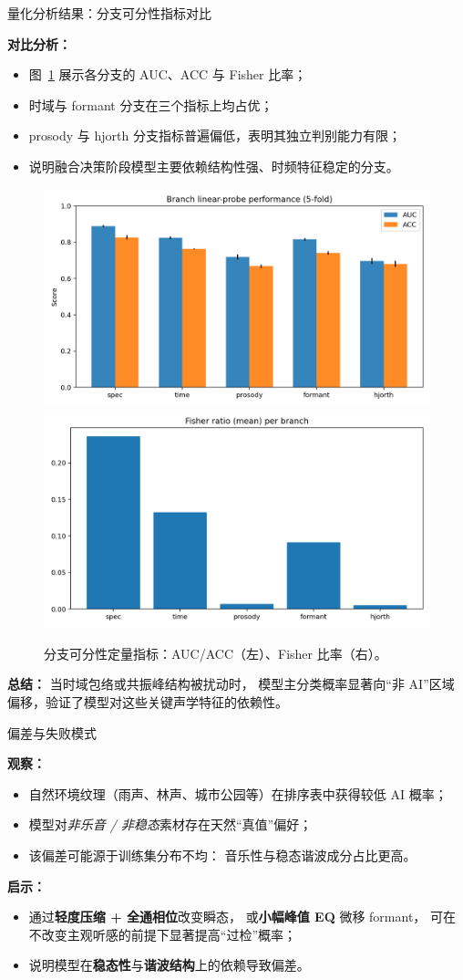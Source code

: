 \documentclass[aspectratio=169]{beamer}
\begin{document}
\begin{frame}{量化分析结果：分支可分性指标对比}

\textbf{对比分析：}
\begin{itemize}
  \item 图~\ref{fig:branch_metrics} 展示各分支的 AUC、ACC 与 Fisher 比率；
  \item 时域与 formant 分支在三个指标上均占优；
  \item prosody 与 hjorth 分支指标普遍偏低，表明其独立判别能力有限；
  \item 说明融合决策阶段模型主要依赖结构性强、时频特征稳定的分支。
\end{itemize}

\vspace{0.6em}
\begin{figure}
  \centering
  \includegraphics[width=0.32\linewidth]{images_in_paper/branch_metrics_auc_acc.png}
  \includegraphics[width=0.32\linewidth]{images_in_paper/branch_fisher.png}
  \caption{分支可分性定量指标：AUC/ACC（左）、Fisher 比率（右）。}
  \label{fig:branch_metrics}
\end{figure}

\textbf{总结：}
当时域包络或共振峰结构被扰动时，  
模型主分类概率显著向“非 AI”区域偏移，验证了模型对这些关键声学特征的依赖性。
\end{frame}

\begin{frame}{偏差与失败模式}

\textbf{观察：}
\begin{itemize}
  \item 自然环境纹理（雨声、林声、城市公园等）在排序表中获得较低 AI 概率；
  \item 模型对\emph{非乐音 / 非稳态}素材存在天然“真值”偏好；
  \item 该偏差可能源于训练集分布不均：
        音乐性与稳态谐波成分占比更高。
\end{itemize}

\vspace{0.6em}
\textbf{启示：}
\begin{itemize}
  \item 通过\textbf{轻度压缩 + 全通相位}改变瞬态，
        或\textbf{小幅峰值 EQ} 微移 formant，
        可在不改变主观听感的前提下显著提高“过检”概率；
  \item 说明模型在\textbf{稳态性}与\textbf{谐波结构}上的依赖导致偏差。
\end{itemize}

\end{frame}
\end{document}
